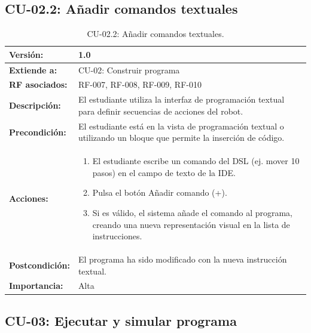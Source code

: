 \subsection{CU-02.2: Añadir comandos textuales}
\begin{table}[H]
	\centering
	\begin{tabularx}{\linewidth}{|p{3cm}|X|}
		\hline
		\textbf{Versión:} & 1.0 \\ \hline
		\textbf{Extiende a:} & CU-02: Construir programa \\ \hline
		\textbf{RF asociados:} & RF-007, RF-008, RF-009, RF-010 \\ \hline
		\textbf{Descripción:} & El estudiante utiliza la interfaz de programación textual para definir secuencias de acciones del robot. \\ \hline
		\textbf{Precondición:} & El estudiante está en la vista de programación textual o utilizando un bloque que permite la inserción de código. \\ \hline
		\textbf{Acciones:} & 
		\begin{enumerate}
			\item El estudiante escribe un comando del DSL (ej. mover 10 pasos) en el campo de texto de la IDE.
			\item Pulsa el botón Añadir comando (+).
			\item Si es válido, el sistema añade el comando al programa, creando una nueva representación visual en la lista de instrucciones.
		\end{enumerate} \\ \hline
		\textbf{Postcondición:} & El programa ha sido modificado con la nueva instrucción textual. \\ \hline
		\textbf{Importancia:} & Alta \\ \hline
	\end{tabularx}
	\caption{CU-02.2: Añadir comandos textuales.}
\end{table}

\subsection{CU-03: Ejecutar y simular programa}


